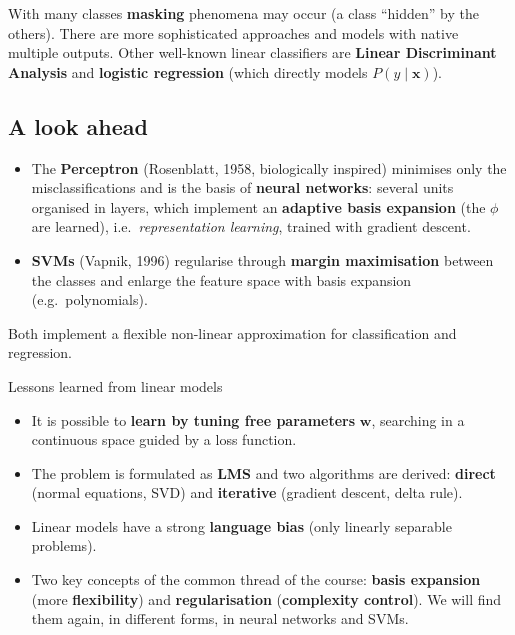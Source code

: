 With many classes \textbf{masking} phenomena may occur (a class
``hidden'' by the others). There are more sophisticated approaches and
models with native multiple outputs. Other well-known linear
classifiers are \textbf{Linear Discriminant Analysis} and
\textbf{logistic regression} (which directly models
\(P(y \mid \mathbf{x})\)).

\subsection{A look ahead}\label{uno-sguardo-avanti}

\begin{itemize}
\tightlist
\item
  The \textbf{Perceptron} (Rosenblatt, 1958, biologically inspired)
  minimises only the misclassifications and is the basis of
  \textbf{neural networks}: several units organised in layers, which
  implement an \textbf{adaptive basis expansion} (the \(\phi\) are
  learned), i.e.\ \emph{representation learning}, trained with gradient
  descent.
\item
  \textbf{SVMs} (Vapnik, 1996) regularise through \textbf{margin
  maximisation} between the classes and enlarge the feature space with
  basis expansion (e.g.\ polynomials).
\end{itemize}

Both implement a flexible non-linear approximation for classification
and regression.

\begin{boxabstract}{Lessons learned from linear models}

\begin{itemize}
\tightlist
\item
  It is possible to \textbf{learn by tuning free parameters}
  \(\mathbf{w}\), searching in a continuous space guided by a loss
  function.
\item
  The problem is formulated as \textbf{LMS} and two algorithms are
  derived: \textbf{direct} (normal equations, SVD) and
  \textbf{iterative} (gradient descent, delta rule).
\item
  Linear models have a strong \textbf{language bias} (only linearly
  separable problems).
\item
  Two key concepts of the common thread of the course: \textbf{basis
  expansion} (more \textbf{flexibility}) and \textbf{regularisation}
  (\textbf{complexity control}). We will find them again, in different
  forms, in neural networks and SVMs.
\end{itemize}

\end{boxabstract}

